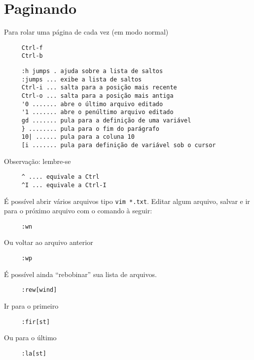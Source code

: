 \section{Paginando}
\label{Paginando}

Para rolar uma página de cada vez (em modo normal)

\begin{verbatim}
     Ctrl-f
     Ctrl-b
\end{verbatim}

\begin{verbatim}
     :h jumps . ajuda sobre a lista de saltos
     :jumps ... exibe a lista de saltos
     Ctrl-i ... salta para a posição mais recente
     Ctrl-o ... salta para a posição mais antiga
     '0 ....... abre o último arquivo editado
     '1 ....... abre o penúltimo arquivo editado
     gd ....... pula para a definição de uma variável
     } ........ pula para o fim do parágrafo
     10| ...... pula para a coluna 10
     [i ....... pula para definição de variável sob o cursor
\end{verbatim}

Observação: lembre-se

\begin{verbatim}
     ^ .... equivale a Ctrl
     ^I ... equivale a Ctrl-I
\end{verbatim}

É possível abrir vários arquivos tipo \verb|vim *.txt|. Editar
algum arquivo, salvar e ir para o próximo arquivo com o comando à
seguir:

\begin{verbatim}
     :wn
\end{verbatim}

Ou voltar ao arquivo anterior

\begin{verbatim}
     :wp
\end{verbatim}

É possível ainda ``rebobinar'' sua lista de arquivos.

\begin{verbatim}
     :rew[wind]
\end{verbatim}

Ir para o primeiro

\begin{verbatim}
     :fir[st]
\end{verbatim}

Ou para o último

\begin{verbatim}
     :la[st]
\end{verbatim}

